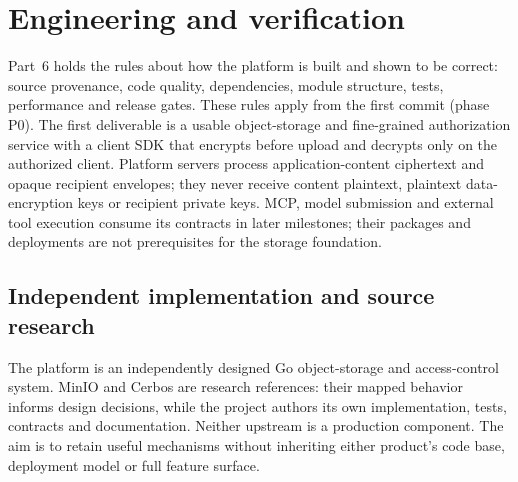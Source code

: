 \section{Engineering and verification}\label{sec:engineering}
Part~6 holds the rules about how the platform is built and shown to be correct: source provenance, code quality, dependencies, module structure, tests, performance and release gates. These rules apply from the first commit (phase P0). The first deliverable is a usable object-storage and fine-grained authorization service with a client SDK that encrypts before upload and decrypts only on the authorized client. Platform servers process application-content ciphertext and opaque recipient envelopes; they never receive content plaintext, plaintext data-encryption keys or recipient private keys. MCP, model submission and external tool execution consume its contracts in later milestones; their packages and deployments are not prerequisites for the storage foundation.

\subsection{Independent implementation and source research}\label{sec:source-research}
The platform is an independently designed Go object-storage and access-control system. MinIO and Cerbos are research references: their mapped behavior informs design decisions, while the project authors its own implementation, tests, contracts and documentation. Neither upstream is a production component. The aim is to retain useful mechanisms without inheriting either product's code base, deployment model or full feature surface.

